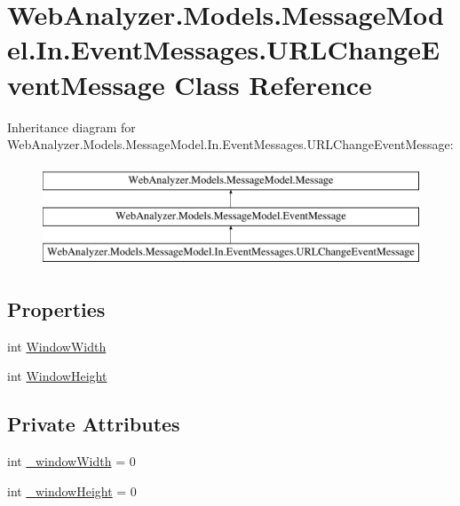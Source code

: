 \hypertarget{class_web_analyzer_1_1_models_1_1_message_model_1_1_in_1_1_event_messages_1_1_u_r_l_change_event_message}{}\section{Web\+Analyzer.\+Models.\+Message\+Model.\+In.\+Event\+Messages.\+U\+R\+L\+Change\+Event\+Message Class Reference}
\label{class_web_analyzer_1_1_models_1_1_message_model_1_1_in_1_1_event_messages_1_1_u_r_l_change_event_message}
Inheritance diagram for Web\+Analyzer.\+Models.\+Message\+Model.\+In.\+Event\+Messages.\+U\+R\+L\+Change\+Event\+Message\+:\begin{figure}[H]
\begin{center}
\leavevmode
\includegraphics[height=3.000000cm]{class_web_analyzer_1_1_models_1_1_message_model_1_1_in_1_1_event_messages_1_1_u_r_l_change_event_message}
\end{center}
\end{figure}
\subsection*{Properties}
\begin{DoxyCompactItemize}
\item 
int \hyperlink{class_web_analyzer_1_1_models_1_1_message_model_1_1_in_1_1_event_messages_1_1_u_r_l_change_event_message_abd2bd1ae084ffc2aecf7daf1f50c5b77}{Window\+Width}
\item 
int \hyperlink{class_web_analyzer_1_1_models_1_1_message_model_1_1_in_1_1_event_messages_1_1_u_r_l_change_event_message_a38465c15df5836ce5f4852a6e749a9fd}{Window\+Height}
\end{DoxyCompactItemize}
\subsection*{Private Attributes}
\begin{DoxyCompactItemize}
\item 
int \hyperlink{class_web_analyzer_1_1_models_1_1_message_model_1_1_in_1_1_event_messages_1_1_u_r_l_change_event_message_afc812d9d7f035f0cf2cdbce736e63ade}{\+\_\+window\+Width} = 0
\item 
int \hyperlink{class_web_analyzer_1_1_models_1_1_message_model_1_1_in_1_1_event_messages_1_1_u_r_l_change_event_message_ab9b0f38d44604e01d516fb9d70e54117}{\+\_\+window\+Height} = 0
\end{DoxyCompactItemize}
